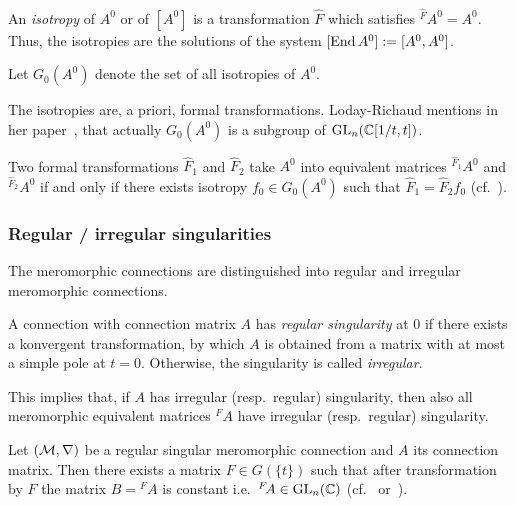 \begin{defn}\label{defn:isotropies}
  An \emph{isotropy} of $A^0$ or of $[A^0]$ is a transformation
  $\hat F$ which satisfies ${}^{\hat F}\!A^0=A^0$.
  Thus, the isotropies are the solutions of the system
  $[\operatorname{End} A^0]:=[A^0,A^0]$.

  Let $G_0(A^0)$ denote the set of all isotropies of $A^0$.
  \begin{s-rem}
    The isotropies are, a priori, formal transformations.
    Loday-Richaud mentions in her paper~\cite[853]{Loday1994}, that
    actually $G_0(A^0)$ is a subgroup of $\operatorname{GL}_n(\mathbb{C}[1/t,t])$.
  \end{s-rem}
\end{defn}
\begin{lem}
  Two formal transformations $\hat F_1$ and $\hat F_2$ take $A^0$ into
  equivalent matrices ${}^{\hat F_1}\!A^0$ and  ${}^{\hat F_2}\!A^0$ if and
  only if there exists isotropy $f_0\in G_0(A^0)$ such that
  $\hat F_1=\hat F_2f_0$
  (cf.~\cite[854]{Loday1994}).
\end{lem}
\begin{comment}
  \begin{proof}
    \TODO[Look at \cite{BJL1979Birkhoff}?]
  \end{proof}
\end{comment}

\subsubsection{Regular / irregular singularities}
The meromorphic connections are distinguished into regular and irregular
meromorphic connections.
\begin{defn}
  A connection with connection matrix $A$ has \emph{regular singularity} at $0$
  if there exists a konvergent transformation, by which $A$ is obtained from a
  matrix with at most a simple pole at $t=0$.
  Otherwise, the singularity is called \emph{irregular}.
  \begin{s-rem}
    This implies that, if $A$ has irregular (resp.\ regular) singularity, then
    also all meromorphic equivalent matrices ${}^{F}\!A$ have irregular
    (resp.\ regular) singularity.
  \end{s-rem}
\end{defn}
\begin{thm}
  Let $(\mathcal{M},\nabla)$ be a regular singular meromorphic connection and $A$ its
  connection matrix.
  Then there exists a matrix $F\in G(\!\{t\}\!)$ such that after transformation
  by $F$ the matrix $B={}^F\!A$ is constant i.e.\ ${}^F\!A\in\operatorname{GL}_n(\mathbb{C})$
  (cf.~\cite[Thm.II.2.8]{sabbah2007isomonodromic}
  or~\cite[Sec.5.1.2]{hotta2008}).
\end{thm}

